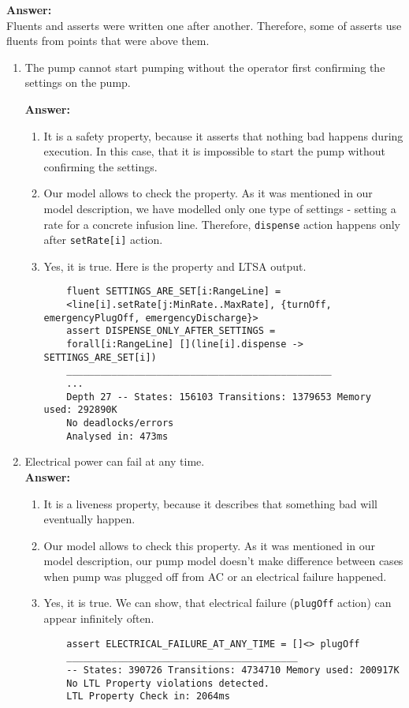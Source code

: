 \documentclass{article}
\begin{document}
\textbf{Answer: } 
\\Fluents and asserts were written one after another. Therefore, some of asserts use fluents from points that were above them.

\begin{enumerate}
    \item The pump cannot start pumping without the operator first confirming the settings on the pump.
    
    \textbf{Answer:}
    \begin{enumerate}
    \item It is a safety property, because it asserts that nothing bad happens during execution. In this case, that it is
    impossible to start the pump without confirming the settings.
    \item  Our model allows to check the property. As it was mentioned in our model description, we have modelled only one
    type of settings - setting a rate for a concrete infusion line. Therefore, \verb|dispense| action happens only after
    \verb|setRate[i]| action.
    \item Yes, it is true. Here is the property and LTSA output.
	\begin{verbatim}
	fluent SETTINGS_ARE_SET[i:RangeLine] = 
	<line[i].setRate[j:MinRate..MaxRate], {turnOff, emergencyPlugOff, emergencyDischarge}>
	assert DISPENSE_ONLY_AFTER_SETTINGS = 
	forall[i:RangeLine] [](line[i].dispense -> SETTINGS_ARE_SET[i])
	_______________________________________________
	...
	Depth 27 -- States: 156103 Transitions: 1379653 Memory used: 292890K
	No deadlocks/errors
	Analysed in: 473ms
	\end{verbatim}    
    \end{enumerate}
    
    \item Electrical power can fail at any time.\\
    \textbf{Answer:}
    \begin{enumerate}
    \item It is a liveness property, because it describes that something bad will eventually happen.
    \item Our model allows to check this property. As it was mentioned in our model description, our pump model doesn't make
    difference between cases when pump was plugged off from AC or an electrical failure happened.
    \item Yes, it is true. We can show, that electrical failure (\verb|plugOff| action) can appear infinitely often.
    \begin{verbatim}
    assert ELECTRICAL_FAILURE_AT_ANY_TIME = []<> plugOff
    _________________________________________
    -- States: 390726 Transitions: 4734710 Memory used: 200917K
    No LTL Property violations detected.
    LTL Property Check in: 2064ms
    \end{verbatim}
    \end{enumerate}
     


\end{enumerate}
\end{document}
